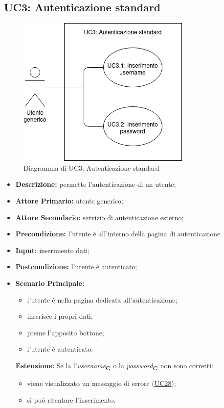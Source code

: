 \subsection{UC3: Autenticazione standard}
\begin{figure}[!ht]
    \caption{Diagramma di UC3: Autenticazione standard}
    \vspace{10px}
    \includegraphics[scale=0.5]{../../../Images/AnalisiRequisiti/UC03}
    \centering
\end{figure}
\label{sec:UC3}
\begin{itemize}
    \item \textbf{Descrizione:} permette l'autenticazione di un utente;
    \item \textbf{Attore Primario:} utente generico;
    \item \textbf{Attore Secondario:} servizio di autenticazione esterno;
    \item \textbf{Precondizione:} l'utente è all'interno della pagina di autenticazione
    \item \textbf{Input:} inserimento dati;
    \item \textbf{Postcondizione:} l'utente è autenticato;
    \item \textbf{Scenario Principale:}
          \begin{itemize}
              \item l'utente è nella pagina dedicata all'autenticazione;
              \item inserisce i propri dati;
              \item preme l'apposito bottone;
              \item l'utente è autenticato.
          \end{itemize}
          \textbf{Estensione:}
          Se la l'\textit{username}\textsubscript{\textbf{G}} o la \textit{password}\textsubscript{\textbf{G}} non sono corretti:
          \begin{itemize}
              \item viene visualizzato un messaggio di errore (\hyperref[sec:UC28]{\underline{UC28}});
              \item si può ritentare l'inserimento.
          \end{itemize}
\end{itemize}
